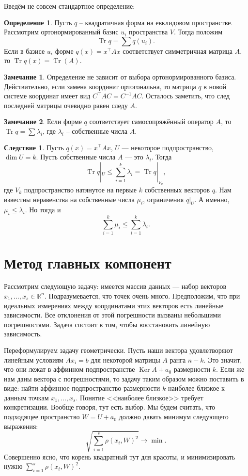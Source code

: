 \documentclass[10pt,a4paper,oneside]{book}
\theoremstyle{definition}
\newtheorem*{rem}{\color{green!50!blue}Замечание}
\newtheorem*{defn}{\color{yellow!30!red} Определение}
\newtheorem{cor}{\color{green!45!black}Следствие}
\renewcommand{\leq}{\leqslant}
\newcommand{\mb}[1]{\mathbb{#1}}
\DeclareMathOperator{\Ker}{Ker}
\newcommand{\Tr}{\operatorname{Tr}}
\def\dfn{\begin{defn}}
\def\edfn{\end{defn}}
\def\crl{\begin{cor}}
\def\ecrl{\end{cor}}
\def\rm{\begin{rem}}
\def\erm{\end{rem}}
\begin{document}
Введём не совсем стандартное определение:
\dfn
Пусть $q$ -- квадратичная форма на евклидовом пространстве. Рассмотрим ортонормированный базис $u_i$ пространства $V$. Тогда положим 
$$\Tr q= \sum q(u_i).$$ Если в базисе $u_i$ форме $q(x)=x^{\top} Ax $ соответствует симметричная матрица $A$, то $\Tr q(x)=\Tr(A)$.
\edfn

\rm Определение не зависит от выбора ортонормированного базиса. Действительно, если замена координат ортогональна, то матрица $q$ в новой системе координат имеет вид $C^{\top}AC=C^{-1}AC$. Осталось заметить, что след последней матрицы очевидно равен следу $A$.
\erm

\rm Если форме $q$ соответствует самосопряжённый оператор $A$, то $\Tr q=\sum \lambda_i$, где $\lambda_i$ -- собственные числа $A$.
\erm




\crl Пусть $q(x)=x^{\top} Ax$, $U$ --- некоторое подпространство, $\dim U=k$. Пусть собственные числа $A$ --- это $\lambda_i$. Тогда $$\Tr q|_U\leq \sum_{i=1}^k \lambda_i= \Tr q|_{V_k},$$
где $V_k$ подпространство натянутое на первые $k$ собственных векторов $q$.
\proof Нам известны неравенства на собственные числа $\mu_i$, ограничения $q|_U$. А именно, $\mu_i\leq \lambda_i$. Но тогда и $$\sum_{i=1}^k \mu_i \leq \sum_{i=1}^k \lambda_i.$$
\endproof
\ecrl 






\section{Метод главных компонент}

Рассмотрим следующую задачу: имеется массив данных --- набор векторов $x_1,\dots,x_s \in \mb R^n$. Подразумевается, что точек очень много. Предположим, что при идеальных измерениях между координатами этих векторов есть линейные зависимости. Все отклонения от этой погрешности вызваны небольшими погрешностями. Задача состоит в том, чтобы восстановить линейную зависимость. 


Переформулируем задачу геометрически. Пусть наши вектора удовлетворяют линейным условиям $Ax_i=b$ для некоторой матрицы $A$ ранга $n-k$. Это значит, что они лежат в аффинном подпространстве $\Ker A + a_0$ размерности $k$. Если же нам даны вектора с погрешностями, то задачу таким образом можно поставить в виде: найти аффинное подпространство размерности $k$ наиболее близкое к данным точкам $x_1,\dots,x_s$. Понятие <<наиболее близкое>> требует конкретизации. Вообще говоря, тут есть выбор. Мы будем считать, что подходящее пространство $W=U+a_0$ должно давать минимум следующего выражения:
$$\sqrt{\sum_{i=1}^s \rho(x_i,W)^2} \to \min.$$
Совершенно ясно, что корень квадратный тут для красоты, и минимизировать нужно $\sum_{i=1}^s \rho(x_i,W)^2$.
\end{document}
